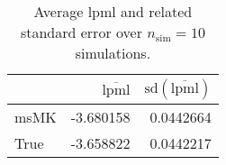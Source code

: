 \begin{table}[H]

\caption{Average lpml and related standard error over $n_{\text{sim}} = 10$ simulations.}
\centering
\begin{tabular}[t]{lrr}
\toprule
  & $\overbar{\text{lpml}}$ & $\text{sd}(\overbar{\text{lpml}})$\\
\midrule
msMK & -3.680158 & 0.0442664\\
True & -3.658822 & 0.0442217\\
\bottomrule
\end{tabular}
\end{table}